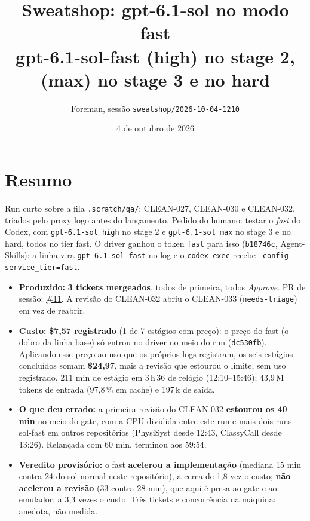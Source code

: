\documentclass[11pt,a4paper]{article}
\title{Sweatshop: gpt-6.1-sol no modo fast\\\large gpt-6.1-sol-fast (high) no stage 2, (max) no stage 3 e no hard}
\author{Foreman, sessão \texttt{sweatshop/2026-10-04-1210}}
\date{4 de outubro de 2026}
\begin{document}
\maketitle

\section*{Resumo}

Run curto sobre a fila \texttt{.scratch/qa/}: CLEAN-027, CLEAN-030 e
CLEAN-032, triados pelo proxy logo antes do lançamento. Pedido do humano:
testar o \emph{fast} do Codex, com \texttt{gpt-6.1-sol high} no stage 2 e
\texttt{gpt-6.1-sol max} no stage 3 e no hard, todos no tier fast. O driver
ganhou o token \texttt{fast} para isso (\texttt{b18746c}, Agent-Skills): a
linha vira \texttt{gpt-6.1-sol-fast} no log e o \texttt{codex exec} recebe
\texttt{--config service\_tier=fast}.

\begin{itemize}
  \item \textbf{Produzido:} \textbf{3 tickets mergeados}, todos de primeira,
        todos \emph{Approve}. PR de sessão:
        \href{https://github.com/Laginho/SynchroNice/pull/11}{\#11}. A revisão
        do CLEAN-032 abriu o CLEAN-033 (\texttt{needs-triage}) em vez de
        reabrir.
  \item \textbf{Custo:} \textbf{\$7,57 registrado} (1 de 7 estágios com
        preço): o preço do fast (o dobro da linha base) só entrou no driver no
        meio do run (\texttt{dc530fb}). Aplicando esse preço ao uso que os
        próprios logs registram, os seis estágios concluídos somam
        \textbf{\$24,97}, mais a revisão que estourou o limite, sem uso
        registrado. 211 min de estágio em 3\,h\,36 de relógio (12:10--15:46);
        43,9\,M tokens de entrada (97,8\,\% em cache) e 197\,k de saída.
  \item \textbf{O que deu errado:} a primeira revisão do CLEAN-032
        \textbf{estourou os 40 min} no meio do gate, com a CPU dividida entre
        este run e mais dois runs sol-fast em outros repositórios (PhysiSyst
        desde 12:43, ClassyCall desde 13:26). Relançada com 60 min, terminou
        aos 59:54.
  \item \textbf{Veredito provisório:} o fast \textbf{acelerou a implementação}
        (mediana 15 min contra 24 do sol normal neste repositório), a cerca de
        1,8 vez o custo; \textbf{não acelerou a revisão} (33 contra 28 min), que
        aqui é presa ao gate e ao emulador, a 3,3 vezes o custo. Três tickets e
        concorrência na máquina: anedota, não medida.
\end{itemize}
\end{document}
